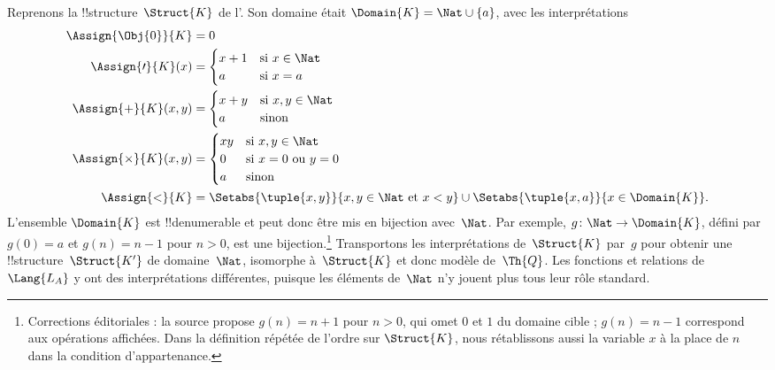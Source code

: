 \documentclass[../../../include/open-logic-section]{subfiles}
\begin{document}
\begin{ex}
Reprenons la !!{structure}~$\Struct{K}$
de l'.
Son domaine était
$\Domain{K}=\Nat\cup\{a\}$,
avec les interprétations
\begin{align*}
  \Assign{\Obj{0}}{K} & = 0\\
  \Assign{\prime}{K}(x) & =
  \begin{cases}
    x+1 & \text{si $x\in\Nat$}\\
    a & \text{si $x=a$}
  \end{cases}\\
  \Assign{+}{K}(x,y) & =
  \begin{cases}
    x+y & \text{si $x,y\in\Nat$}\\
    a & \text{sinon}
  \end{cases}\\
  \Assign{\times}{K}(x,y) & =
  \begin{cases}
    xy & \text{si $x,y\in\Nat$}\\
    0 & \text{si $x=0$ ou $y=0$}\\
    a & \text{sinon}
  \end{cases}\\
  \Assign{<}{K} & =
  \Setabs{\tuple{x,y}}{x,y\in\Nat
    \text{ et }x<y}
  \cup
  \Setabs{\tuple{x,a}}{x\in\Domain{K}}.
\end{align*}
L'ensemble $\Domain{K}$ est
!!{denumerable} et peut donc être mis
en bijection avec~$\Nat$. Par exemple,
$g\colon\Nat\to\Domain{K}$, défini par
$g(0)=a$ et $g(n)=n-1$ pour $n>0$,
est une bijection.\footnote{Corrections éditoriales : la source propose $g(n)=n+1$ pour $n>0$, qui omet $0$ et $1$ du domaine cible ; $g(n)=n-1$ correspond aux opérations affichées. Dans la définition répétée de l'ordre sur $\Struct{K}$, nous rétablissons aussi la variable $x$ à la place de $n$ dans la condition d'appartenance.} Transportons les
interprétations de~$\Struct{K}$ par~$g$
pour obtenir une !!{structure}~$\Struct{K'}$
de domaine~$\Nat$, isomorphe
à~$\Struct{K}$ et donc modèle de~$\Th{Q}$.
Les fonctions et relations de~$\Lang{L_A}$
y ont des interprétations différentes,
puisque les éléments de~$\Nat$ n'y jouent
plus tous leur rôle standard.


\end{ex}
\end{document}
